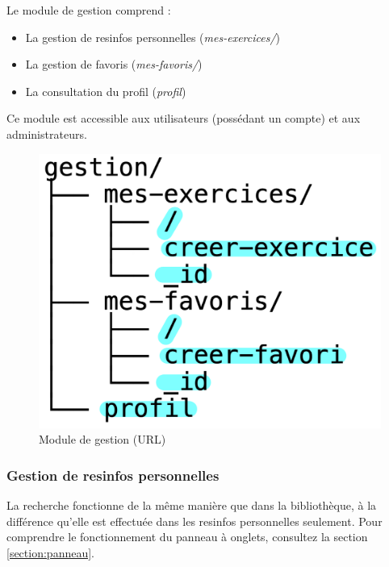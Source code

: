 Le module de gestion comprend :

\begin{itemize}
    \item La gestion de \glspl{resinfo} personnelles (\textit{mes-exercices/})
    \item La gestion de favoris (\textit{mes-favoris/})
    \item La consultation du profil (\textit{profil})
\end{itemize}

Ce module est accessible aux utilisateurs (possédant un compte) et aux administrateurs.

\begin{figure}[H]
    \includegraphics[width=\textwidth,height=0.2\textheight,keepaspectratio]{images/client/gestion.jpeg}
    \centering
    \caption[SourceCode : module de gestion (URL)]{Module de gestion (URL)}
\end{figure}

\subsubsection{Gestion de \glspl{resinfo} personnelles}
\label{section:gestionResInfo}

La recherche fonctionne de la même manière que dans la bibliothèque, à la différence qu'elle est effectuée dans les \glspl{resinfo} personnelles seulement. Pour comprendre le fonctionnement du panneau à onglets, consultez la section \ref{section:panneau}.

